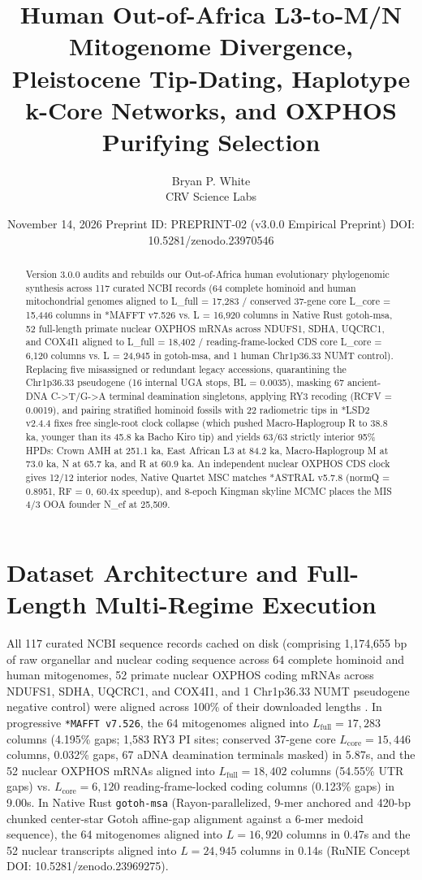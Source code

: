 \documentclass[10pt,letterpaper]{article}
\title{Human Out-of-Africa L3-to-M/N Mitogenome Divergence, Pleistocene Tip-Dating, Haplotype k-Core Networks, and OXPHOS Purifying Selection}
\author{Bryan P. White \\ CRV Science Labs}
\date{November 14, 2026 \textbullet{} Preprint ID: PREPRINT-02 (v3.0.0 Empirical Preprint) \textbullet{} DOI: 10.5281/zenodo.23970546}
\begin{document}
\maketitle

\begin{abstract}
Version 3.0.0 audits and rebuilds our Out-of-Africa human evolutionary phylogenomic synthesis across 117 curated NCBI records (64 complete hominoid and human mitochondrial genomes aligned to L\_full = 17,283 / conserved 37-gene core L\_core = 15,446 columns in *MAFFT v7.526 vs. L = 16,920 columns in Native Rust gotoh-msa, 52 full-length primate nuclear OXPHOS mRNAs across NDUFS1, SDHA, UQCRC1, and COX4I1 aligned to L\_full = 18,402 / reading-frame-locked CDS core L\_core = 6,120 columns vs. L = 24,945 in gotoh-msa, and 1 human Chr1p36.33 NUMT control). Replacing five misassigned or redundant legacy accessions, quarantining the Chr1p36.33 pseudogene (16 internal UGA stops, BL = 0.0035), masking 67 ancient-DNA C->T/G->A terminal deamination singletons, applying RY3 recoding (RCFV = 0.0019), and pairing stratified hominoid fossils with 22 radiometric tips in *LSD2 v2.4.4 fixes free single-root clock collapse (which pushed Macro-Haplogroup R to 38.8 ka, younger than its 45.8 ka Bacho Kiro tip) and yields 63/63 strictly interior 95\% HPDs: Crown AMH at 251.1 ka, East African L3 at 84.2 ka, Macro-Haplogroup M at 73.0 ka, N at 65.7 ka, and R at 60.9 ka. An independent nuclear OXPHOS CDS clock gives 12/12 interior nodes, Native Quartet MSC matches *ASTRAL v5.7.8 (normQ = 0.8951, RF = 0, 60.4x speedup), and 8-epoch Kingman skyline MCMC places the MIS 4/3 OOA founder N\_ef at 25,509.
\end{abstract}

\section{Dataset Architecture and Full-Length Multi-Regime Execution}
All 117 curated NCBI sequence records cached on disk (comprising 1,174,655 bp of raw organellar and nuclear coding sequence across 64 complete hominoid and human mitogenomes, 52 primate nuclear OXPHOS coding mRNAs across NDUFS1, SDHA, UQCRC1, and COX4I1, and 1 Chr1p36.33 NUMT pseudogene negative control) were aligned across 100\% of their downloaded lengths \cite{white2026runie,ingman2000mitochondrial,soares2009correcting,fu2013revised}. In progressive \texttt{*MAFFT v7.526}, the 64 mitogenomes aligned into $L_{\mathrm{full}} = 17,283$ columns (4.195\% gaps; 1,583 RY3 PI sites; conserved 37-gene core $L_{\mathrm{core}} = 15,446$ columns, 0.032\% gaps, 67 aDNA deamination terminals masked) in 5.87s, and the 52 nuclear OXPHOS mRNAs aligned into $L_{\mathrm{full}} = 18,402$ columns (54.55\% UTR gaps) vs. $L_{\mathrm{core}} = 6,120$ reading-frame-locked coding columns (0.123\% gaps) in 9.00s. In Native Rust \texttt{gotoh-msa} (Rayon-parallelized, 9-mer anchored and 420-bp chunked center-star Gotoh affine-gap alignment against a 6-mer medoid sequence), the 64 mitogenomes aligned into $L = 16,920$ columns in 0.47s and the 52 nuclear transcripts aligned into $L = 24,945$ columns in 0.14s (RuNIE Concept DOI: 10.5281/zenodo.23969275).
\end{document}
